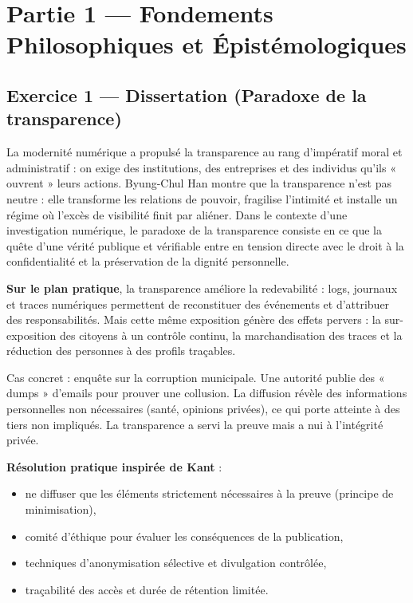 \documentclass[11pt]{article}
\begin{document}
\section{Partie 1 — Fondements Philosophiques et Épistémologiques}
\subsection{Exercice 1 — Dissertation (Paradoxe de la transparence)}

La modernité numérique a propulsé la transparence au rang d’impératif moral et administratif : on exige des institutions, des entreprises et des individus qu’ils « ouvrent » leurs actions. Byung-Chul Han montre que la transparence n’est pas neutre : elle transforme les relations de pouvoir, fragilise l’intimité et installe un régime où l’excès de visibilité finit par aliéner. Dans le contexte d’une investigation numérique, le paradoxe de la transparence consiste en ce que la quête d’une vérité publique et vérifiable entre en tension directe avec le droit à la confidentialité et la préservation de la dignité personnelle.  

\textbf{Sur le plan pratique}, la transparence améliore la redevabilité : logs, journaux et traces numériques permettent de reconstituer des événements et d’attribuer des responsabilités. Mais cette même exposition génère des effets pervers : la sur-exposition des citoyens à un contrôle continu, la marchandisation des traces et la réduction des personnes à des profils traçables.  

Cas concret : enquête sur la corruption municipale. Une autorité publie des « dumps » d’emails pour prouver une collusion. La diffusion révèle des informations personnelles non nécessaires (santé, opinions privées), ce qui porte atteinte à des tiers non impliqués. La transparence a servi la preuve mais a nui à l’intégrité privée.  

\textbf{Résolution pratique inspirée de Kant} :  
\begin{itemize}
  \item ne diffuser que les éléments strictement nécessaires à la preuve (principe de minimisation),
  \item comité d’éthique pour évaluer les conséquences de la publication,
  \item techniques d’anonymisation sélective et divulgation contrôlée,
  \item traçabilité des accès et durée de rétention limitée.
\end{itemize}
\end{document}
